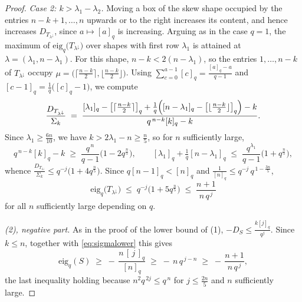 \documentclass[11pt]{article}
\theoremstyle{plain}  %
\newcommand{\eig}{\text{eig}} %
\begin{document}
\begin{proof}
\emph{Case 2: $k > \lambda_1 - \lambda_2$.} Moving a box of the skew shape
occupied by the entries $n-k+1,\ldots,n$ upwards or to the right increases its
content, and hence increases $D_{T_{\lambda^{\downarrow}}}$, since
$a \mapsto [a]_q$ is increasing. Arguing as in the case $q=1$, the maximum of
$\mathrm{eig}_q\bigl(T_{\lambda^{\downarrow}}\bigr)$ over shapes with first
row $\lambda_1$ is attained at $\lambda = (\lambda_1, n-\lambda_1)$. For this
shape, $n-k < 2(n-\lambda_1)$, so the entries $1, \ldots, n-k$ of
$T_{\lambda^{\downarrow}}$ occupy
$\mu = \bigl(\lceil\tfrac{n-k}{2}\rceil, \lfloor\tfrac{n-k}{2}\rfloor\bigr)$.
Using $\sum_{c=0}^{a-1}[c]_q = \frac{[a]_q - a}{q-1}$ and
$[c-1]_q = \frac{1}{q}\bigl([c]_q - 1\bigr)$, we compute
$$
  \frac{D_{T_{\lambda^{\downarrow}}}}{\Sigma_k}
  \;=\;
  \frac{[\lambda_1]_q - \bigl[\lceil\tfrac{n-k}{2}\rceil\bigr]_q
        + \tfrac{1}{q}\Bigl([n-\lambda_1]_q
        - \bigl[\lfloor\tfrac{n-k}{2}\rfloor\bigr]_q\Bigr) - k}
       {q^{\,n-k}[k]_q - k}.
$$
Since $\lambda_1 \ge \frac{6n}{10}$, we have
$k >  2\lambda_1 - n \ge \frac{n}{5}$, so for $n$
sufficiently large,
$$
  q^{\,n-k}[k]_q - k \;\ge\; \frac{q^{\,n}}{q-1}\bigl(1 - 2q^{\frac{n}{5}}\bigr),
  \qquad
  [\lambda_1]_q + \tfrac{1}{q}[n-\lambda_1]_q
  \;\le\; \frac{q^{\lambda_1}}{q-1}\bigl(1 + q^{\frac{n}{5}}\bigr),
$$
whence $\frac{D_{T_{\lambda^{\downarrow}}}}{\Sigma_k} \le
q^{-j}\bigl(1 + 4q^{\frac{n}{5}}\bigr)$. Since $q[n-1]_q < [n]_q$ and
$\frac{1}{[n]_q} \le q^{-j}\,q^{\,1-\frac{3n}{5}}$,
$$
  \mathrm{eig}_q\bigl(T_{\lambda^{\downarrow}}\bigr)
  \;\le\; q^{-j}\bigl(1 + 5q^{\frac{n}{5}}\bigr)
  \;\le\; \frac{n+1}{n\,q^{\,j}}
$$
for all $n$ sufficiently large depending on $q$.

\emph{(2), negative part.} As in the proof of the lower bound of (1),
$-D_S \le \frac{k[j]_q}{q^j}$. Since $k \le n$, together with \eqref{eq:sigmalower} this gives
$$
  \mathrm{eig}_q(S)
  \;\ge\; -\,\frac{n\,[\,j\,]_q}{[n]_q}
  \;\ge\; -\,n\,q^{\,j-n}
  \;\ge\; -\,\frac{n+1}{n\,q^{\,j}},
$$
the last inequality holding because $n^2 q^{\,2j} \le q^{\,n}$ for
$j \le \frac{2n}{5}$ and $n$ sufficiently large.


\end{proof}
\end{document}
